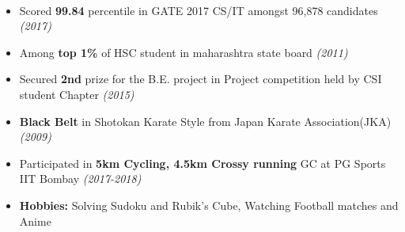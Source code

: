 \documentclass[a4paper,10pt]{article}
\newcommand{\isep}{-2 pt}
\begin{document}
\\[-0.3cm]
\begin{itemize}\itemsep \isep
    \item Scored \textbf{99.84} percentile in GATE 2017 CS/IT amongst 96,878 candidates \emph{\hfill  (2017)}
    \item Among \textbf{top 1\%} of HSC student in maharashtra state board \emph{\hfill  (2011)}
    \item Secured \textbf{2nd} prize for the B.E. project in Project competition held by CSI student Chapter
    \emph{\hfill  (2015)}
    \item \textbf{Black Belt} in Shotokan Karate Style from Japan Karate Association(JKA) \emph{\hfill  (2009)}
    \item Participated in \textbf{5km Cycling, 4.5km Crossy running} GC at PG Sports IIT Bombay \emph{\hfill  (2017-2018)}
    \item \textbf{Hobbies:} Solving Sudoku and Rubik's Cube, Watching Football matches and Anime
\end{itemize}
\end{document}
